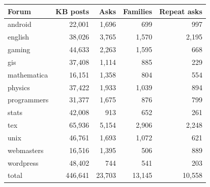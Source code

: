 \begin{tabular}{lrrrr}\toprule Forum & KB posts & Asks & Families & Repeat asks\\\midrule
android & 22,001 & 1,696 & 699 & 997\\
english & 38,026 & 3,765 & 1,570 & 2,195\\
gaming & 44,633 & 2,263 & 1,595 & 668\\
gis & 37,408 & 1,114 & 885 & 229\\
mathematica & 16,151 & 1,358 & 804 & 554\\
physics & 37,422 & 1,933 & 1,039 & 894\\
programmers & 31,377 & 1,675 & 876 & 799\\
stats & 42,008 & 913 & 652 & 261\\
tex & 65,936 & 5,154 & 2,906 & 2,248\\
unix & 46,761 & 1,693 & 1,072 & 621\\
webmasters & 16,516 & 1,395 & 506 & 889\\
wordpress & 48,402 & 744 & 541 & 203\\
\midrule total & 446,641 & 23,703 & 13,145 & 10,558\\\bottomrule\end{tabular}